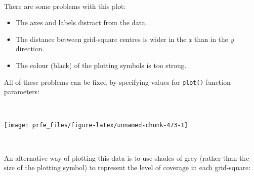\documentclass[12pt,a4paper]{book}
\newenvironment{Shaded}{\begin{snugshade}}{\end{snugshade}}
\newcommand{\DataTypeTok}[1]{\textcolor[rgb]{0.13,0.29,0.53}{#1}}
\newcommand{\DecValTok}[1]{\textcolor[rgb]{0.00,0.00,0.81}{#1}}
\newcommand{\FloatTok}[1]{\textcolor[rgb]{0.00,0.00,0.81}{#1}}
\newcommand{\KeywordTok}[1]{\textcolor[rgb]{0.13,0.29,0.53}{\textbf{#1}}}
\newcommand{\NormalTok}[1]{#1}
\newcommand{\OperatorTok}[1]{\textcolor[rgb]{0.81,0.36,0.00}{\textbf{#1}}}
\newcommand{\OtherTok}[1]{\textcolor[rgb]{0.56,0.35,0.01}{#1}}
\newcommand{\StringTok}[1]{\textcolor[rgb]{0.31,0.60,0.02}{#1}}
\theoremstyle{definition}
\theoremstyle{definition}
\theoremstyle{definition}
\theoremstyle{remark}
\begin{document}
~

There are some problems with this plot:

\begin{itemize}
\item
  The axes and labels distract from the data.
\item
  The distance between grid-square centres is wider in the \emph{x} than
  in the \emph{y} direction.
\item
  The colour (black) of the plotting symbols is too strong.
\end{itemize}

All of these problems can be fixed by specifying values for
\texttt{plot()} function parameters:

~

\begin{Shaded}
\end{Shaded}

\begin{center}\texttt{[image: prfe\_files/figure-latex/unnamed-chunk-473-1]} \end{center}

~

An alternative way of plotting this data is to use shades of grey
(rather than the size of the plotting symbol) to represent the level of
coverage in each grid-square:

~

\begin{Shaded}
\end{Shaded}
\end{document}
